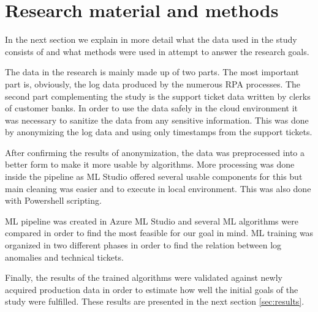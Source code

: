 

\section{Research material and methods}\label{sec:research-material-and-methods}

In the next section
we explain in more detail
what the data used in the study
consists of
and what methods were used
in attempt to answer the research goals.

The data in the research is mainly made up of two parts.
The most important part is, obviously,
the log data produced by the numerous RPA processes.
The second part complementing the study
is the support ticket data written by clerks of customer banks.
In order to use the data safely in the cloud environment
it was necessary to sanitize the data
from any sensitive information.
This was done by anonymizing the log data
and using only timestamps from the support tickets.

After confirming the results of anonymization,
the data was preprocessed into a better form
to make it more usable by algorithms.
More processing was done inside the pipeline
as ML Studio offered several usable components for this
but main cleaning was easier and to execute in local environment.
This was also done with Powershell scripting.

ML pipeline was created in Azure ML Studio
and several ML algorithms were compared
in order to find the most feasible for our goal in mind.
ML training was organized in two different phases
in order to find the relation between
log anomalies and technical tickets.

Finally,
the results of the trained algorithms
were validated against newly acquired production data
in order to estimate how well the initial goals of the study
were fulfilled.
These results are presented in the next section \ref{sec:results}.


